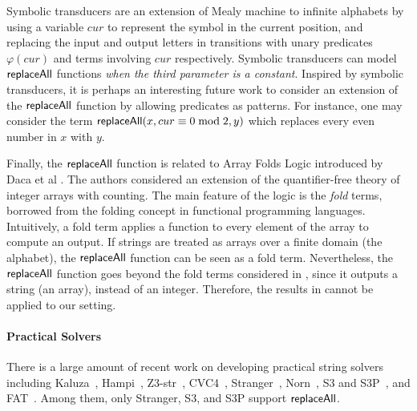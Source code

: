 Symbolic transducers are an extension of Mealy machine to infinite alphabets by using a variable $cur$ to represent the symbol in the current position, and replacing the input and output letters in transitions with unary predicates $\varphi(cur)$ and terms involving $cur$ respectively. Symbolic transducers can model $\mathsf{replaceAll}$ functions \emph{when the third parameter is a constant}. Inspired by symbolic transducers, it is perhaps an interesting future work to consider an extension of the $\mathsf{replaceAll}$ function by allowing predicates as patterns. %
For instance, one may consider the term $\mathsf{replaceAll}(x, cur \equiv 0 \bmod 2, y)$ which replaces every even number in $x$ with $y$. %

Finally, the $\mathsf{replaceAll}$ function is related to Array Folds Logic introduced by Daca et al \cite{DHK16}. The authors considered an extension of the quantifier-free theory of integer arrays with counting. The main feature of the logic is the \emph{fold} terms, borrowed from the folding concept in functional programming languages. Intuitively, a fold term applies a function to every element of the array to compute an output. If strings are treated as arrays over a finite domain (the alphabet), the $\mathsf{replaceAll}$ function can be seen as a fold term. Nevertheless, the $\mathsf{replaceAll}$ function goes beyond the fold terms considered in \cite{DHK16}, since it outputs a string (an array), instead of an integer. Therefore, the results in \cite{DHK16} cannot be applied to our setting.

\paragraph{Practical Solvers}
There is a large amount of recent work on developing practical string solvers
including  Kaluza~\cite{Berkeley-JavaScript}, Hampi~\cite{HAMPI}, 
Z3-str~\cite{Z3-str}, CVC4~\cite{cvc4}, Stranger~\cite{YABI14}, Norn~\cite{Abdulla14}, S3 and S3P~\cite{S3,TCJ16}, and FAT~\cite{Abdulla17}.
Among them, only Stranger, S3, and S3P support $\mathsf{replaceAll}$.  



